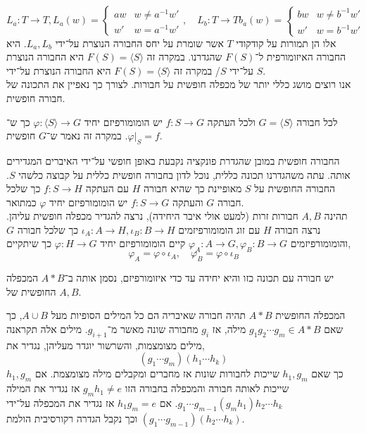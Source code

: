 \[
	L_a : T \to T,
	L_a(w)
	= \begin{cases}
		aw & w \ne a^{-1} w' \\
		w' & w = a^{-1} w'
	\end{cases},
	\quad
	L_b : T \to T
	b_a(w)
	= \begin{cases}
		bw & w \ne b^{-1} w' \\
		w' & w = b^{-1} w'
	\end{cases}
\]
אלו הן תמורות על קודקודי $T$ אשר שומרת על יחס החבורה הנוצרת על־ידי $L_a, L_b$.
היא החבורה האיזומורפית ל־$F(S)$ שהגדרנו.
במקרה זה $F(S) = \langle S \rangle$ היא החבורה הנוצרת על־ידי $S$/
במקרה זה $F(S) = \langle S \rangle$ היא החבורה הנוצרת על־ידי $S$. \\
אנו רוצים מושג כללי יותר של מכפלה חופשית על חבורות.
לצורך כך נאפיין את התכונה של חבורה חופשית.
\begin{definition}
	לכל חבורה $G = \langle S \rangle$ ולכל העתקה $f : S \to G$ יש הומומורפיזם יחיד $\varphi : \langle S \rangle \to G$ כך ש־$\varphi |_S = f$.
	במקרה זה נאמר ש־$G$ חופשית.
\end{definition}
החבורה חופשית במובן שהגדרת פונקציה נקבעת באופן חופשי על־ידי האיברים המגדירים אותה.
עתה משהגדרנו תכונה כללית, נוכל לדון בחבורה חופשית כללית על קבוצה כלשהי $S$.
החבורה החופשית על $S$ מאופיינת כך שהיא חבורה $H$ עם העתקה $f : S \to H$ כך שלכל חבורה $G$ והעתקה $f : S \to G$ יש הומומורפיזם יחיד $\varphi$ כמתואר. \\
תהינה $A, B$ חבורות זרות (למעט אולי איבר היחידה), נרצה להגדיר מכפלה חופשית עליהן.
נרצה חבורה $H$ עם זוג הומומורפיזמים $\iota_A : A \to H, \iota_B : B \to H$ כך שלכל חבורה $G$ והומומורפיזמים $\varphi_A : A \to G, \varphi_B : B \to G$ קיים הומומורפיזם יחיד $\varphi : H \to G$ כך שיתקיים,
\[
	\varphi_A = \varphi \circ \iota_A,
	\quad
	\varphi_B = \varphi \circ \iota_B
\]
\begin{proposition}
	יש חבורה עם תכונה כזו והיא יחידה עד כדי איזומורפיזם, נסמן אותה ב־$A * B$ המכפלה החופשית של $A, B$.
\end{proposition}
\begin{definition}
	המכפלה החופשית $A * B$ תהיה חבורה שאיבריה הם כל המילים הסופיות מעל $A \cup B$,
	כך שאם $g_1 g_2 \cdots g_m \in A * B$ מילה, אז $g_i$ מחבורה שונה מאשר מ־$g_{i + 1}$.
	מילים אלה תקראנה מילים מצומצמות, והשרשור יוגדר מעליהן,
	נגדיר את,
	\[
		(g_1 \cdots g_m)(h_1 \cdots h_k)
	\]
	כך שאם $h_1, g_m$ שייכות לחבורות שונות אז מחברים ומקבלים מילה מצומצמת.
	אם $h_1, g_m$ שייכות לאותה חבורה והמכפלה בחבורה הזו $g_m h_1 \ne e$ אז נגדיר את המילה $g_1 \cdots g_{m - 1} (g_m h_1) h_2 \cdots h_k$.
	אם $h_1 g_m = e$ אז נגדיר את המכפלה על־ידי $(g_1 \cdots g_{m - 1})(h_2 \cdots h_k)$ וכך נקבל הגדרה רקורסיבית הולמת.
\end{definition}
